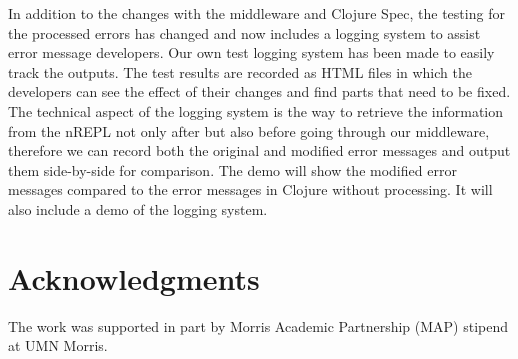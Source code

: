 \documentclass[12pt]{article}
\begin{document}
In addition to the changes with the middleware and Clojure Spec, the testing for the processed errors has changed and now includes a logging system to assist error message developers. Our own test logging system has been made to easily track the outputs. The test results are recorded as HTML files in which the developers can see the effect of their changes and find parts that need to be fixed. The technical aspect of the logging system is the way to retrieve the information from the nREPL not only after but also before going through our middleware, therefore we can record both the original and modified error messages and output them side-by-side for comparison.
The demo will show the modified error messages compared to the error messages in Clojure without processing. It will also include a demo of the logging system.


\section{Acknowledgments}
The work was supported in part by Morris Academic Partnership (MAP) stipend at UMN Morris.

%
%
\end{document}
